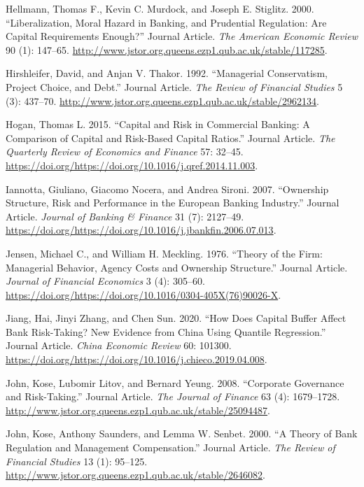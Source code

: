\documentclass{article}
\begin{document}
\leavevmode\hypertarget{ref-RN48}{}%
Hellmann, Thomas F., Kevin C. Murdock, and Joseph E. Stiglitz. 2000.
``Liberalization, Moral Hazard in Banking, and Prudential Regulation:
Are Capital Requirements Enough?'' Journal Article. \emph{The American
Economic Review} 90 (1): 147--65.
\url{http://www.jstor.org.queens.ezp1.qub.ac.uk/stable/117285}.

\leavevmode\hypertarget{ref-RN49}{}%
Hirshleifer, David, and Anjan V. Thakor. 1992. ``Managerial
Conservatism, Project Choice, and Debt.'' Journal Article. \emph{The
Review of Financial Studies} 5 (3): 437--70.
\url{http://www.jstor.org.queens.ezp1.qub.ac.uk/stable/2962134}.

\leavevmode\hypertarget{ref-RN50}{}%
Hogan, Thomas L. 2015. ``Capital and Risk in Commercial Banking: A
Comparison of Capital and Risk-Based Capital Ratios.'' Journal Article.
\emph{The Quarterly Review of Economics and Finance} 57: 32--45.
\url{https://doi.org/https://doi.org/10.1016/j.qref.2014.11.003}.

\leavevmode\hypertarget{ref-RN51}{}%
Iannotta, Giuliano, Giacomo Nocera, and Andrea Sironi. 2007. ``Ownership
Structure, Risk and Performance in the European Banking Industry.''
Journal Article. \emph{Journal of Banking \& Finance} 31 (7): 2127--49.
\url{https://doi.org/https://doi.org/10.1016/j.jbankfin.2006.07.013}.

\leavevmode\hypertarget{ref-RN52}{}%
Jensen, Michael C., and William H. Meckling. 1976. ``Theory of the Firm:
Managerial Behavior, Agency Costs and Ownership Structure.'' Journal
Article. \emph{Journal of Financial Economics} 3 (4): 305--60.
\url{https://doi.org/https://doi.org/10.1016/0304-405X(76)90026-X}.

\leavevmode\hypertarget{ref-RN53}{}%
Jiang, Hai, Jinyi Zhang, and Chen Sun. 2020. ``How Does Capital Buffer
Affect Bank Risk-Taking? New Evidence from China Using Quantile
Regression.'' Journal Article. \emph{China Economic Review} 60: 101300.
\url{https://doi.org/https://doi.org/10.1016/j.chieco.2019.04.008}.

\leavevmode\hypertarget{ref-RN54}{}%
John, Kose, Lubomir Litov, and Bernard Yeung. 2008. ``Corporate
Governance and Risk-Taking.'' Journal Article. \emph{The Journal of
Finance} 63 (4): 1679--1728.
\url{http://www.jstor.org.queens.ezp1.qub.ac.uk/stable/25094487}.

\leavevmode\hypertarget{ref-RN55}{}%
John, Kose, Anthony Saunders, and Lemma W. Senbet. 2000. ``A Theory of
Bank Regulation and Management Compensation.'' Journal Article.
\emph{The Review of Financial Studies} 13 (1): 95--125.
\url{http://www.jstor.org.queens.ezp1.qub.ac.uk/stable/2646082}.
\end{document}
